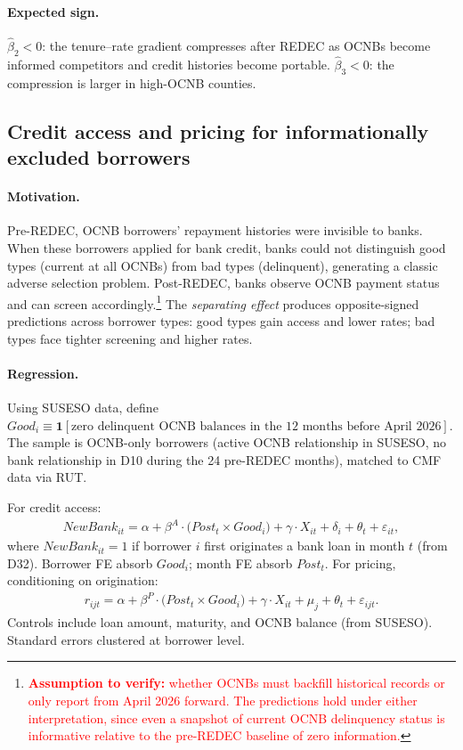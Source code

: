 \documentclass[12pt]{article}
\theoremstyle{plain}
\theoremstyle{plain}
\begin{document}
\paragraph{Expected sign.} $\hat{\beta}_2 < 0$: the tenure--rate gradient compresses after REDEC as OCNBs become informed competitors and credit histories become portable. $\hat{\beta}_3 < 0$: the compression is larger in high-OCNB counties.

\subsection{Credit access and pricing for informationally excluded borrowers}

\paragraph{Motivation.} Pre-REDEC, OCNB borrowers' repayment histories were invisible to banks. When these borrowers applied for bank credit, banks could not distinguish good types (current at all OCNBs) from bad types (delinquent), generating a classic adverse selection problem. Post-REDEC, banks observe OCNB payment status and can screen accordingly.\footnote{\textcolor{red}{\textbf{Assumption to verify:} whether OCNBs must backfill historical records or only report from April 2026 forward. The predictions hold under either interpretation, since even a snapshot of current OCNB delinquency status is informative relative to the pre-REDEC baseline of zero information.}} The \textit{separating effect} produces opposite-signed predictions across borrower types: good types gain access and lower rates; bad types face tighter screening and higher rates.

\paragraph{Regression.} Using SUSESO data, define $Good_i \equiv \mathbf{1}[\text{zero delinquent OCNB balances in the 12 months before April 2026}]$. The sample is OCNB-only borrowers (active OCNB relationship in SUSESO, no bank relationship in D10 during the 24 pre-REDEC months), matched to CMF data via RUT.

For credit access:
\begin{align}
    NewBank_{it} = \alpha + \beta^{A} \cdot \bigl(Post_t \times Good_i\bigr) + \gamma \cdot X_{it} + \delta_i + \theta_t + \varepsilon_{it},
\label{eq:access_hetero}
\end{align}
where $NewBank_{it} = 1$ if borrower $i$ first originates a bank loan in month $t$ (from D32). Borrower FE absorb $Good_i$; month FE absorb $Post_t$. For pricing, conditioning on origination:
\begin{align}\label{eq:pricing_hetero}
    r_{ijt} = \alpha + \beta^{P} \cdot \bigl(Post_t \times Good_i\bigr) + \gamma \cdot X_{it} + \mu_j + \theta_t + \varepsilon_{ijt}.
\end{align}
Controls include loan amount, maturity, and OCNB balance (from SUSESO). Standard errors clustered at borrower level.
\end{document}
